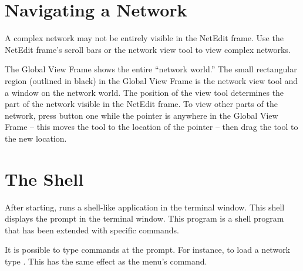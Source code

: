 \section{Navigating a Network}
\label{sec:navnetwork}

A complex network may not be entirely visible in the NetEdit frame.
Use the NetEdit frame's scroll bars or the network view tool to view
complex networks.

The Global View Frame shows the entire ``network world.''  The small
rectangular region (outlined in black) in the Global View Frame is the
network view tool and a window on the network world. The
position of the view tool determines the part of the network 
visible in the NetEdit frame.  To view other parts of the network, press
button one while the pointer is anywhere in the Global View Frame -- this 
moves the tool to the location of the pointer --  then drag the tool to the
new location.


\section{The \sr{} Shell}
\label{sec:termapp}

After starting, \sr{} runs a shell-like application in the terminal
window. This shell displays the prompt
 in the terminal window.  This program is a
 shell program that has been extended with
\sr{} specific commands.

It is possible to type \tcl{} \sr{} commands at the prompt.  For
instance, to load a network type .  This has the same effect as the 
menu's  command.



